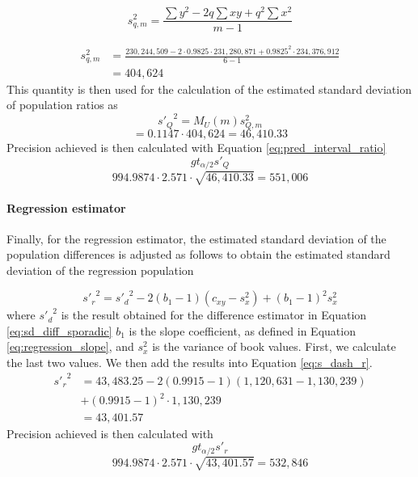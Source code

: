\begin{equation}
	s_{q, m}^2 = \frac{\sum{y^2} - 2q\sum{xy} + q^2\sum{x^2}}{m - 1}
	\label{eq:sd_ratios_m}
\end{equation}

\begin{align*}
	s_{q, m}^2 &= \frac{230,244,509 - 2 \cdot 0.9825 \cdot 231,280,871 + 0.9825^2 \cdot 234,376,912}{6 - 1} \\ 
	&= 404,624
\end{align*}
This quantity is then used for the calculation of the estimated standard deviation of population ratios as
\begin{equation}
	{s'_Q}^2 = M_U(m) s_{Q, m}^2
\end{equation}
\begin{equation*}
	= 0.1147 \cdot 404,624 = 46,410.33
\end{equation*}
Precision achieved is then calculated with Equation \ref{eq:pred_interval_ratio}
\begin{equation*}
  g t_{\alpha/2} s'_Q
\end{equation*}
\begin{equation*}
  994.9874 \cdot 2.571 \cdot \sqrt{46,410.33} = 551,006
\end{equation*}

\paragraph{Regression estimator}

Finally, for the regression estimator, the estimated standard deviation of the population differences is adjusted as follows to obtain the estimated standard deviation of the regression population

\begin{equation}
	{s'_{r}}^2 = {s'_{d}}^2 - 2(b_1 - 1)(c_{xy} - s_x^2) + (b_1 - 1)^2 s_x^2
	\label{eq:s_dash_r}
\end{equation}
where ${s'_{d}}^2$ is the result obtained for the difference estimator in Equation \ref{eq:sd_diff_sporadic} $b_1$ is the slope coefficient, as defined in Equation \ref{eq:regression_slope}, and $s_x^2$ is the variance of book values. First, we calculate the last two values.
We then add the results into Equation \ref{eq:s_dash_r}.
\begin{align*}
	{s'_{r}}^2 &= 43,483.25 - 2(0.9915 - 1)(1,120,631 - 1,130,239) \\
	&+ (0.9915 - 1)^2 \cdot 1,130,239 \\
	&= 43,401.57
\end{align*}
Precision achieved is then calculated with 
\begin{equation*}
  g t_{\alpha/2} s'_r
\end{equation*}
\begin{equation*}
  994.9874 \cdot 2.571 \cdot \sqrt{43,401.57} = 532,846
\end{equation*}

